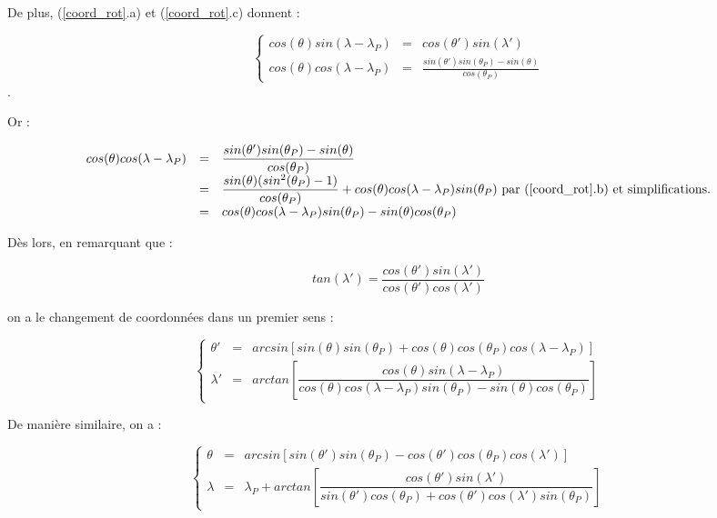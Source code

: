 De plus, (\ref{coord_rot}.a) et (\ref{coord_rot}.c) donnent :

\begin{equation}
\left\lbrace 
\begin{array}{rcl}
cos( \theta ) sin( \lambda - \lambda_P) & = & cos( \theta' ) sin( \lambda' ) \\
cos( \theta ) cos( \lambda - \lambda_P) & = & \frac{sin( \theta' ) sin ( \theta_P ) - sin( \theta )}{cos( \theta_P)}
\end{array}
\right.
\end{equation}.

Or :

\begin{equation*}
\begin{array}{rcl}
cos( \theta ) cos( \lambda - \lambda_P) & = & \dfrac{sin( \theta' ) sin ( \theta_P ) - sin( \theta )}{cos( \theta_P)} \\
 & = & \dfrac{sin( \theta) (sin^2 ( \theta_P) -1 )}{cos( \theta_P)} + cos( \theta ) cos( \lambda- \lambda_P) sin( \theta_P) \text{ par (\ref{coord_rot}.b) et simplifications.} \\
 & = & cos ( \theta) cos( \lambda - \lambda_P) sin( \theta_P ) - sin( \theta) cos ( \theta_P )
\end{array}
\end{equation*}

Dès lors, en remarquant que :

$$tan ( \lambda' ) =  \dfrac{cos( \theta' ) sin(  \lambda' ) }{cos( \theta' ) cos(  \lambda' )}$$

on a le changement de coordonnées dans un premier sens :

\begin{equation}
\label{from classic to prime}
\left\lbrace 
\begin{array}{rcl}
\theta' & = & arcsin \left[ sin( \theta) sin(\theta_P) + cos( \theta ) cos( \theta_P) cos( \lambda - \lambda_P ) \right] \\
\lambda' & = & arctan \left[ \dfrac{cos ( \theta) sin( \lambda - \lambda_P)}{cos( \theta) cos( \lambda - \lambda_P) sin( \theta_P) - sin( \theta) cos( \theta_P)} \right]
\end{array}
\right.
\end{equation}

De manière similaire, on a :

\begin{equation}
\label{from prime to classic}
\left\lbrace 
\begin{array}{rcl}
\theta & = & arcsin \left[ sin( \theta') sin(\theta_P) - cos( \theta' ) cos( \theta_P) cos( \lambda' ) \right] \\
\lambda & = & \lambda_P + arctan \left[ \dfrac{cos ( \theta') sin( \lambda ')}{sin( \theta') cos( \theta_P) + cos ( \theta') cos( \lambda') sin ( \theta_P)} \right]
\end{array}
\right.
\end{equation}


